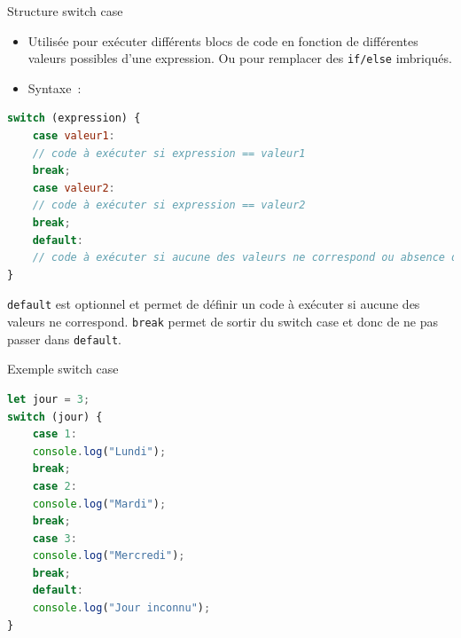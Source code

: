 \documentclass{beamer}
\begin{document}
    \begin{frame}[fragile]{Structure switch case}
        \begin{itemize}
            \item Utilisée pour exécuter différents blocs de code en fonction de différentes
            valeurs possibles d'une expression.
            Ou pour remplacer des \lstinline{if/else} imbriqués.
            \item Syntaxe~:
        \end{itemize}
        \begin{lstlisting}[language=JavaScript,title={\tiny{Script JavaScript}}]
switch (expression) {
    case valeur1:
    // code à exécuter si expression == valeur1
    break;
    case valeur2:
    // code à exécuter si expression == valeur2
    break;
    default:
    // code à exécuter si aucune des valeurs ne correspond ou absence de break
}
        \end{lstlisting}
        \lstinline{default} est optionnel et permet de définir un code à exécuter si aucune des valeurs ne correspond.
        \lstinline{break} permet de sortir du switch case et donc de ne pas passer dans \lstinline{default}.
    \end{frame}

    \begin{frame}[fragile]{Exemple switch case}
        \begin{lstlisting}[language=JavaScript,title={\tiny{Script JavaScript}}]
let jour = 3;
switch (jour) {
    case 1:
    console.log("Lundi");
    break;
    case 2:
    console.log("Mardi");
    break;
    case 3:
    console.log("Mercredi");
    break;
    default:
    console.log("Jour inconnu");
}
        \end{lstlisting}
    \end{frame}
\end{document}
